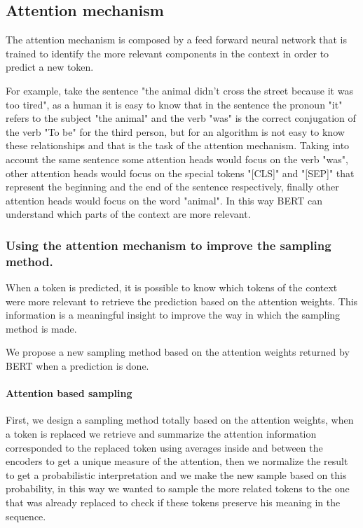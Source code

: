 \documentclass[10pt,twocolumn,letterpaper]{article}
\begin{document}
\subsection{Attention mechanism}
The attention mechanism is composed by a feed forward neural network that is trained to
identify the more relevant components in the context in order to predict a new token.

For example, take the sentence "the animal didn't cross the street because it was too tired",
as a human it is easy to know that in the sentence the pronoun "it" refers to the subject "the animal"
and the verb "was" is the correct conjugation of the verb "To be" for the third person, but for an
algorithm is not easy to know these relationships and that is the task of the attention mechanism.
Taking into account the same sentence
some attention heads would focus on the verb "was", other attention heads would focus
on the special tokens "[CLS]" and "[SEP]" that represent the beginning and the end of the sentence
respectively, finally other attention heads would focus on the word "animal". In this way BERT can
understand which parts of the context are more relevant.

\subsubsection{Using the attention mechanism to improve the sampling method.}
When a token is predicted, it is possible to know which tokens of the context were more relevant to
retrieve the prediction based on the attention weights.
This information is a meaningful insight to improve
the way in which the sampling method is made.

We propose a new sampling method based on the attention
weights returned by BERT when a prediction is done.

\paragraph{Attention based sampling}
First, we design a sampling method totally based on the attention weights, when a token is replaced we retrieve
and summarize the attention information corresponded to the replaced token using averages inside and between the
encoders to get a unique measure of the attention, then we normalize the result to get a probabilistic interpretation
and we make the new sample based on this probability, in this way we wanted to sample the more related tokens to the one
that was already replaced to check if these tokens preserve his meaning in the sequence.
\end{document}
